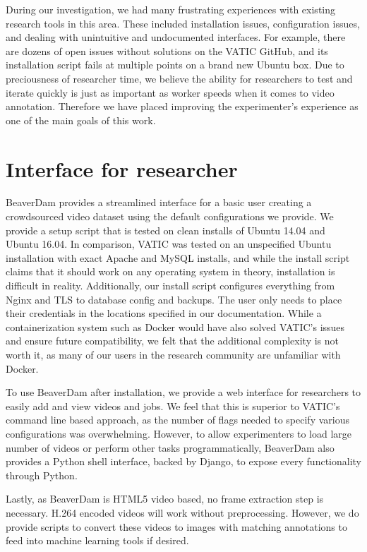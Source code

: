 
During our investigation, we had many frustrating experiences with existing research tools in this area.
These included installation issues, configuration issues, and dealing with unintuitive and undocumented interfaces.
For example, there are dozens of open issues without solutions on the VATIC GitHub,
and its installation script fails at multiple points on a brand new Ubuntu box.
Due to preciousness of researcher time,
we believe the ability for researchers to test and iterate quickly is just as important as worker speeds when it comes to video annotation.
Therefore we have placed improving the experimenter's experience as one of the main goals of this work.

\section{Interface for researcher}

BeaverDam provides a streamlined interface for a basic user creating a crowdsourced video dataset using the default configurations we provide.
We provide a setup script that is tested on clean installs of Ubuntu 14.04 and Ubuntu 16.04.
In comparison, VATIC was tested on an unspecified Ubuntu installation with exact Apache and MySQL installs,
and while the install script claims that it should work on any operating system in theory,
installation is difficult in reality.
Additionally, our install script configures everything from Nginx and TLS to database config and backups.
The user only needs to place their credentials in the locations specified in our documentation.
While a containerization system such as Docker would have also solved VATIC's issues and ensure future compatibility,
we felt that the additional complexity is not worth it, as many of our users in the research community are unfamiliar with Docker.

To use BeaverDam after installation, we provide a web interface for researchers to easily add and view videos and jobs.
We feel that this is superior to VATIC's command line based approach,
as the number of flags needed to specify various configurations was overwhelming.
However, to allow experimenters to load large number of videos or perform other tasks programmatically,
BeaverDam also provides a Python shell interface, backed by Django, to expose every functionality through Python.

Lastly, as BeaverDam is HTML5 video based, no frame extraction step is necessary.
H.264 encoded videos will work without preprocessing.
However, we do provide scripts to convert these videos to images with matching annotations to feed into machine learning tools if desired.

